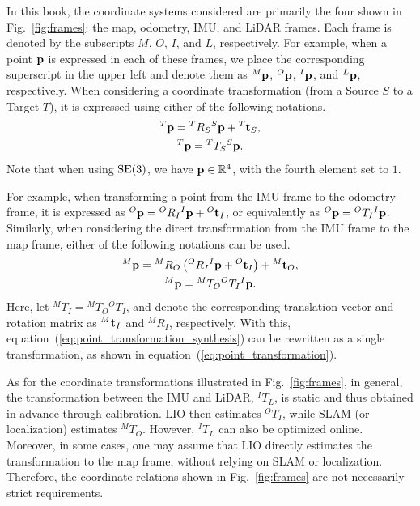 In this book, the coordinate systems considered are primarily the four shown in Fig.~\ref{fig:frames}: the map, odometry, IMU, and LiDAR frames.
Each frame is denoted by the subscripts $M$, $O$, $I$, and $L$, respectively.
For example, when a point ${\bf p}$ is expressed in each of these frames, we place the corresponding superscript in the upper left and denote them as ${}^{M}{\bf p}$, ${}^{O}{\bf p}$, ${}^{I}{\bf p}$, and ${}^{L}{\bf p}$, respectively.
When considering a coordinate transformation (from a Source $S$ to a Target $T$), it is expressed using either of the following notations.
%
\begin{align}
  \begin{gathered}
    {}^{T}{\bf p} = {}^{T}R_{S} {}^{S}{\bf p} + {}^{T}{\bf t}_{S}, \\
%
    {}^{T}{\bf p} = {}^{T}T_{S} {}^{S}{\bf p}.
  \end{gathered}
  \label{eq:point_transformation}
\end{align}
%
Note that when using ${\rm SE}(3)$, we have ${\bf p} \in \mathbb{R}^{4}$, with the fourth element set to $1$.

For example, when transforming a point from the IMU frame to the odometry frame, it is expressed as ${}^{O}{\bf p} = {}^{O}R_{I} {}^{I}{\bf p} + {}^{O}{\bf t}_{I}$, or equivalently as ${}^{O}{\bf p} = {}^{O}T_{I} {}^{I}{\bf p}$.
Similarly, when considering the direct transformation from the IMU frame to the map frame, either of the following notations can be used.
%
\begin{align}
  \begin{gathered}
    {}^{M}{\bf p} = {}^{M}R_{O} \left( {}^{O}R_{I} {}^{I}{\bf p} + {}^{O}{\bf t}_{I} \right) + {}^{M}{\bf t}_{O}, \\
%
    {}^{M}{\bf p} = {}^{M}T_{O} {}^{O}T_{I} {}^{I}{\bf p}.
  \end{gathered}
  \label{eq:point_transformation_synthesis}
\end{align}
%
Here, let ${}^{M}T_{I} = {}^{M}T_{O} {}^{O}T_{I}$, and denote the corresponding translation vector and rotation matrix as ${}^{M}{\bf t}_{I}$ and ${}^{M}R_{I}$, respectively.
With this, equation~(\ref{eq:point_transformation_synthesis}) can be rewritten as a single transformation, as shown in equation~(\ref{eq:point_transformation}).

As for the coordinate transformations illustrated in Fig.~\ref{fig:frames}, in general, the transformation between the IMU and LiDAR, ${}^{I}T_{L}$, is static and thus obtained in advance through calibration.
LIO then estimates ${}^{O}T_{I}$, while SLAM (or localization) estimates ${}^{M}T_{O}$.
However, ${}^{I}T_{L}$ can also be optimized online.
Moreover, in some cases, one may assume that LIO directly estimates the transformation to the map frame, without relying on SLAM or localization.
Therefore, the coordinate relations shown in Fig.~\ref{fig:frames} are not necessarily strict requirements.


